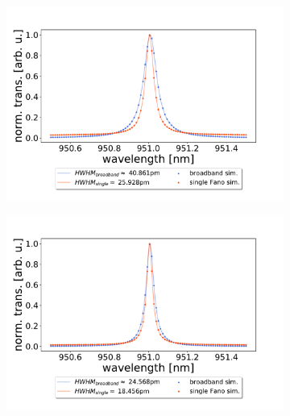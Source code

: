 \begin{figure}[h!]
    \centering
    \begin{subfigure}[b]{0.49\textwidth}
        \includegraphics[width=\textwidth]{figures/sim_single_vs_broadband_90um.pdf}
        \caption{}
        \label{fig:single_vs_broadband_simulation_90um}
    \end{subfigure}
    \begin{subfigure}[b]{0.49\textwidth}
        \includegraphics[width=\textwidth]{figures/sim_single_vs_broadband_150um.pdf}
        \caption{}
        \label{fig:single_vs_broadband_simulation_150um}
    \end{subfigure}
\end{figure}

